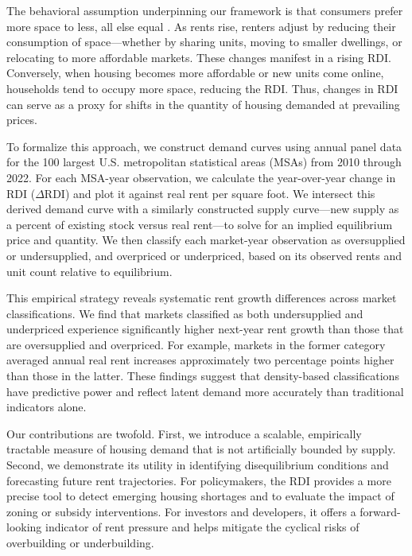 \documentclass[sn-mathphys-num]{sn-jnl}%
\begin{document}
The behavioral assumption underpinning our framework is that consumers prefer more space to less, all else equal \citep{molloy2022housing, muth1969cities}. As rents rise, renters adjust by reducing their consumption of space---whether by sharing units, moving to smaller dwellings, or relocating to more affordable markets. These changes manifest in a rising RDI. Conversely, when housing becomes more affordable or new units come online, households tend to occupy more space, reducing the RDI. Thus, changes in RDI can serve as a proxy for shifts in the quantity of housing demanded at prevailing prices.

To formalize this approach, we construct demand curves using annual panel data for the 100 largest U.S. metropolitan statistical areas (MSAs) from 2010 through 2022. For each MSA-year observation, we calculate the year-over-year change in RDI (\( \Delta \text{RDI} \)) and plot it against real rent per square foot. We intersect this derived demand curve with a similarly constructed supply curve---new supply as a percent of existing stock versus real rent---to solve for an implied equilibrium price and quantity. We then classify each market-year observation as oversupplied or undersupplied, and overpriced or underpriced, based on its observed rents and unit count relative to equilibrium.

This empirical strategy reveals systematic rent growth differences across market classifications. We find that markets classified as both undersupplied and underpriced experience significantly higher next-year rent growth than those that are oversupplied and overpriced. For example, markets in the former category averaged annual real rent increases approximately two percentage points higher than those in the latter. These findings suggest that density-based classifications have predictive power and reflect latent demand more accurately than traditional indicators alone.

Our contributions are twofold. First, we introduce a scalable, empirically tractable measure of housing demand that is not artificially bounded by supply. Second, we demonstrate its utility in identifying disequilibrium conditions and forecasting future rent trajectories. For policymakers, the RDI provides a more precise tool to detect emerging housing shortages and to evaluate the impact of zoning or subsidy interventions. For investors and developers, it offers a forward-looking indicator of rent pressure and helps mitigate the cyclical risks of overbuilding or underbuilding.
\end{document}

